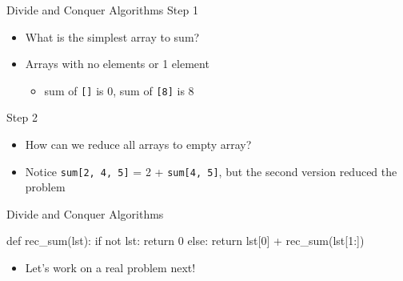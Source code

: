 \documentclass[
  ignorenonframetext,
]{beamer}
\newenvironment{Shaded}{\begin{snugshade}}{\end{snugshade}}
\newcommand{\ControlFlowTok}[1]{\textcolor[rgb]{0.00,0.23,0.31}{#1}}
\newcommand{\DecValTok}[1]{\textcolor[rgb]{0.68,0.00,0.00}{#1}}
\newcommand{\KeywordTok}[1]{\textcolor[rgb]{0.00,0.23,0.31}{#1}}
\newcommand{\NormalTok}[1]{\textcolor[rgb]{0.00,0.23,0.31}{#1}}
\newcommand{\OperatorTok}[1]{\textcolor[rgb]{0.37,0.37,0.37}{#1}}
\providecommand{\tightlist}{%
  \setlength{\itemsep}{0pt}\setlength{\parskip}{0pt}}\usepackage{longtable,booktabs,array}
\begin{document}
\begin{frame}[fragile]{Divide and Conquer Algorithms}
\protect\hypertarget{divide-and-conquer-algorithms-1}{}
Step 1

\begin{itemize}
\item
  What is the simplest array to sum?
\item
  Arrays with no elements or 1 element

  \begin{itemize}
  \tightlist
  \item
    sum of \texttt{{[}{]}} is 0, sum of \texttt{{[}8{]}} is 8
  \end{itemize}
\end{itemize}

Step 2

\begin{itemize}
\item
  How can we reduce all arrays to empty array?
\item
  Notice \texttt{sum{[}2,\ 4,\ 5{]}} = 2 + \texttt{sum{[}4,\ 5{]}}, but
  the second version reduced the problem
\end{itemize}
\end{frame}

\begin{frame}[fragile]{Divide and Conquer Algorithms}
\protect\hypertarget{divide-and-conquer-algorithms-2}{}
\begin{Shaded}
\begin{Highlighting}[]
\KeywordTok{def}\NormalTok{ rec\_sum(lst):}
  \ControlFlowTok{if} \KeywordTok{not}\NormalTok{ lst:}
    \ControlFlowTok{return} \DecValTok{0}
  \ControlFlowTok{else}\NormalTok{:}
    \ControlFlowTok{return}\NormalTok{ lst[}\DecValTok{0}\NormalTok{] }\OperatorTok{+}\NormalTok{ rec\_sum(lst[}\DecValTok{1}\NormalTok{:])}
\end{Highlighting}
\end{Shaded}

\begin{itemize}
\tightlist
\item
  Let's work on a real problem next!
\end{itemize}
\end{frame}
\end{document}
